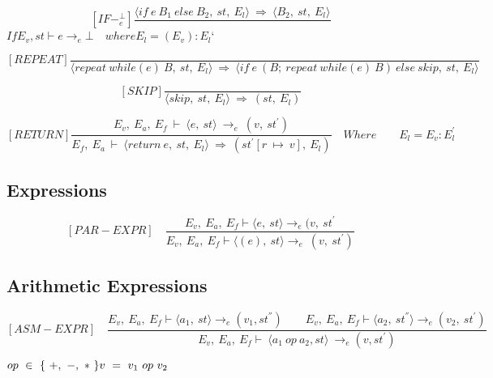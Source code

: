 	\[
	[IF-^{\bot}_e]
	\dfrac{\langle if \ e \ B_1 \ else \ B_2, \ st, \ E_l \rangle \ \Rightarrow \ \langle B_2, \ st, \ E_l \rangle}{}
	\]
	\begin{math}
		If E_v, st \vdash e \rightarrow_e \bot \quad where E_l = (E_v) : E_l{‘}
	\end{math}
	
	\[
	[REPEAT]
	\dfrac{}{\langle repeat \ while(e) \ B, \ st, \ E_l \rangle \ \Rightarrow \ \langle if \ e \ (B; \ repeat \ while(e) \ B) \ else \ skip, \ st, \ E_l \rangle}
	\]
	
	\[
	[SKIP]
	\dfrac{}{\langle skip, \ st, \ E_l \rangle \ \Rightarrow \ (st, \ E_l)}
	\]
	
	\[
	[RETURN]	
	\dfrac{E_v, \ E_a, \ E_f \ \vdash \ \langle e, \ st \rangle \ \rightarrow_e \ (v, \ st^{'})}{E_f, \ E_a \ \vdash \ \langle return \ e, \ st, \ E_l \rangle \ \Rightarrow \ (st^{'}[r \ \mapsto \ v], \ E_l)}
	\quad Where	
	\qquad E_l = E_v : E_l^{'}	
	\]
	
	
	
	
	
	\subsection{Expressions}
	
	
	
	
	
	\[	
	[PAR-EXPR] \quad	
	\dfrac{E_v, \ E_a, \ E_f \vdash \langle e, \ st \rangle \rightarrow_e (v, \ st^{'}}{E_v, \ E_a, \ E_f \vdash \langle (e), \ st \rangle \rightarrow_e \ (v, \ st^{'})}	
	\]
	
	
	
	
	
	
	
	
	
	\subsection{Arithmetic Expressions}
	
	
	
	
	
	\[
	[ASM-EXPR] \quad	
	\dfrac{E_v, \ E_a, \ E_f \vdash \langle a_1, \ st \rangle \rightarrow_{e} (v_1, st^{''}) \qquad E_v, \ E_a, \ E_f \vdash \langle a_2, \ st^{''}\rangle \rightarrow_e (v_2, \ st^{'})}{E_v, \ E_a, \ E_f \vdash \ \langle a_1 \ op \ a_2, st \rangle \ \rightarrow_{e} (v, st^{'})}	
	\]
	
	
	\begin{math}		
		op \ \in \ \{ \ +, \ -, \ * \ \} \newline		
		v \ = \ v_1 \ op \ v_2		
	\end{math}
	
